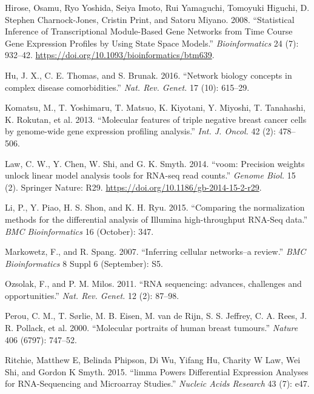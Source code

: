 \documentclass[]{article}
\begin{document}
\leavevmode\hypertarget{ref-Hirose2008}{}%
Hirose, Osamu, Ryo Yoshida, Seiya Imoto, Rui Yamaguchi, Tomoyuki
Higuchi, D. Stephen Charnock-Jones, Cristin Print, and Satoru Miyano.
2008. ``Statistical Inference of Transcriptional Module-Based Gene
Networks from Time Course Gene Expression Profiles by Using State Space
Models.'' \emph{Bioinformatics} 24 (7): 932--42.
\url{https://doi.org/10.1093/bioinformatics/btm639}.

\leavevmode\hypertarget{ref-Hu2016}{}%
Hu, J. X., C. E. Thomas, and S. Brunak. 2016. ``Network biology concepts
in complex disease comorbidities.'' \emph{Nat. Rev. Genet.} 17 (10):
615--29.

\leavevmode\hypertarget{ref-Komatsu2013}{}%
Komatsu, M., T. Yoshimaru, T. Matsuo, K. Kiyotani, Y. Miyoshi, T.
Tanahashi, K. Rokutan, et al. 2013. ``Molecular features of triple
negative breast cancer cells by genome-wide gene expression profiling
analysis.'' \emph{Int. J. Oncol.} 42 (2): 478--506.

\leavevmode\hypertarget{ref-Law2014}{}%
Law, C. W., Y. Chen, W. Shi, and G. K. Smyth. 2014. ``voom: Precision
weights unlock linear model analysis tools for RNA-seq read counts.''
\emph{Genome Biol.} 15 (2). Springer Nature: R29.
\url{https://doi.org/10.1186/gb-2014-15-2-r29}.

\leavevmode\hypertarget{ref-Li2015}{}%
Li, P., Y. Piao, H. S. Shon, and K. H. Ryu. 2015. ``Comparing the
normalization methods for the differential analysis of Illumina
high-throughput RNA-Seq data.'' \emph{BMC Bioinformatics} 16 (October):
347.

\leavevmode\hypertarget{ref-Markowetz2007}{}%
Markowetz, F., and R. Spang. 2007. ``Inferring cellular networks--a
review.'' \emph{BMC Bioinformatics} 8 Suppl 6 (September): S5.

\leavevmode\hypertarget{ref-Ozsolak2011}{}%
Ozsolak, F., and P. M. Milos. 2011. ``RNA sequencing: advances,
challenges and opportunities.'' \emph{Nat. Rev. Genet.} 12 (2): 87--98.

\leavevmode\hypertarget{ref-Perou2000}{}%
Perou, C. M., T. Sørlie, M. B. Eisen, M. van de Rijn, S. S. Jeffrey, C.
A. Rees, J. R. Pollack, et al. 2000. ``Molecular portraits of human
breast tumours.'' \emph{Nature} 406 (6797): 747--52.

\leavevmode\hypertarget{ref-limma}{}%
Ritchie, Matthew E, Belinda Phipson, Di Wu, Yifang Hu, Charity W Law,
Wei Shi, and Gordon K Smyth. 2015. ``limma Powers Differential
Expression Analyses for RNA-Sequencing and Microarray Studies.''
\emph{Nucleic Acids Research} 43 (7): e47.
\end{document}
